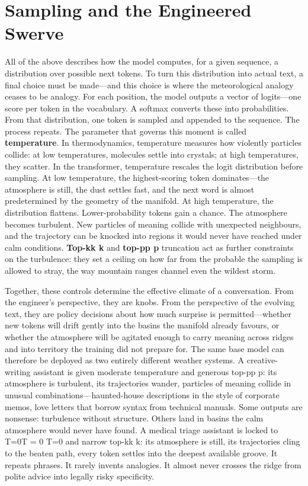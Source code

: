\section{Sampling and the Engineered Swerve}
All of the above describes how the model computes, for a given sequence, a distribution over possible next tokens. To turn this distribution into actual text, a final choice must be made---and this choice is where the meteorological analogy ceases to be analogy.
For each position, the model outputs a vector of logits---one score per token in the vocabulary. A softmax converts these into probabilities. From that distribution, one token is sampled and appended to the sequence. The process repeats.
The parameter that governs this moment is called \textbf{temperature}. In thermodynamics, temperature measures how violently particles collide: at low temperatures, molecules settle into crystals; at high temperatures, they scatter. In the transformer, temperature rescales the logit distribution before sampling. At low temperature, the highest-scoring token dominates---the atmosphere is still, the dust settles fast, and the next word is almost predetermined by the geometry of the manifold. At high temperature, the distribution flattens. Lower-probability tokens gain a chance. The atmosphere becomes turbulent. New particles of meaning collide with unexpected neighbours, and the trajectory can be knocked into regions it would never have reached under calm conditions. \textbf{Top-kk
k} and \textbf{top-pp
p} truncation act as further constraints on the turbulence: they set a ceiling on how far from the probable the sampling is allowed to stray, the way mountain ranges channel even the wildest storm.

Together, these controls determine the effective climate of a conversation. From the engineer's perspective, they are knobs. From the perspective of the evolving text, they are policy decisions about how much surprise is permitted---whether new tokens will drift gently into the basins the manifold already favours, or whether the atmosphere will be agitated enough to carry meaning across ridges and into territory the training did not prepare for.
The same base model can therefore be deployed as two entirely different weather systems. A creative-writing assistant is given moderate temperature and generous top-pp
p: its atmosphere is turbulent, its trajectories wander, particles of meaning collide in unusual combinations---haunted-house descriptions in the style of corporate memos, love letters that borrow syntax from technical manuals. Some outputs are nonsense: turbulence without structure. Others land in basins the calm atmosphere would never have found. A medical triage assistant is locked to T=0T = 0
T=0 and narrow top-kk
k: its atmosphere is still, its trajectories cling to the beaten path, every token settles into the deepest available groove. It repeats phrases. It rarely invents analogies. It almost never crosses the ridge from polite advice into legally risky specificity.

